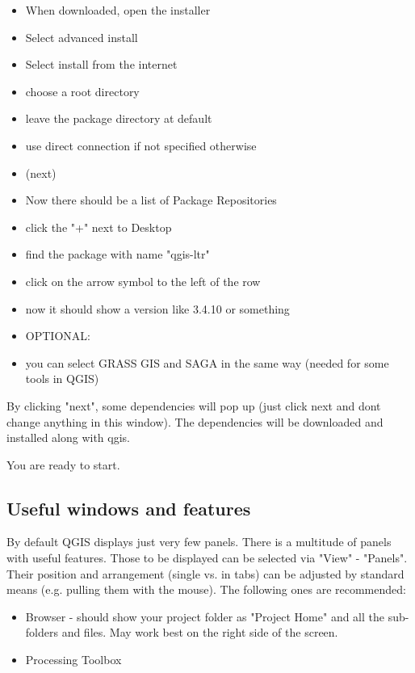 \documentclass[12pt,a4paper]{scrartcl}
\begin{document}
\begin{itemize}
	\item When downloaded, open the installer
	\item Select advanced install
	\item Select install from the internet
	\item choose a root directory 
	\item leave the package directory at default
	\item use direct connection if not specified otherwise
	\item (next)
	\item Now there should be a list of Package Repositories
	\item click the "+" next to Desktop
	\item find the package with name "qgis-ltr"
	\item click on the arrow symbol to the left of the row
	\item now it should show a version like 3.4.10 or something
	\item OPTIONAL: 
	\item you can select GRASS GIS and SAGA in the same way (needed for some tools in QGIS)
\end{itemize}

By clicking "next", some dependencies will pop up (just click next and dont change anything in this window).
The dependencies will be downloaded and installed along with qgis.\newline

You are ready to start.

\subsection{Useful windows and features}
\label{subsec:qgis_adjust}
By default QGIS displays just very few panels. There is a multitude of panels with useful features. Those to be displayed can be selected via "View" - "Panels". Their position and arrangement (single vs. in tabs) can be adjusted by standard means (e.g. pulling them with the mouse). The following ones are recommended:
\begin{itemize}
	\item Browser - should show your project folder as "Project Home"  and all the sub-folders and files. May work best on the right side of the screen.
	\item Processing Toolbox
\end{itemize}
\end{document}
